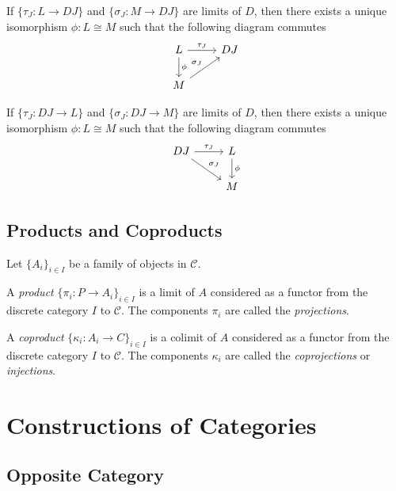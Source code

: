 \begin{thm}
If $\{ \tau_J : L \rightarrow D J \}$ and $\{ \sigma_J : M \rightarrow D J \}$ are limits of $D$, then there exists a unique isomorphism $\phi : L \cong M$ such that the following diagram commutes
\[ \begin{tikzcd}
L \arrow[r,"\tau_J"] \arrow[d,"\phi"] & D J \\
M \arrow[ur,"\sigma_J"]
\end{tikzcd} \]
\end{thm}

\begin{thm}
If $\{ \tau_J : D J \rightarrow L \}$ and $\{ \sigma_J : D J \rightarrow M \}$ are limits of $D$, then there exists a unique isomorphism $\phi : L \cong M$ such that the following diagram commutes
\[ \begin{tikzcd}
D J \arrow[r,"\tau_J"] \arrow[dr,"\sigma_J"] & L \arrow[d,"\phi"] \\
& M
\end{tikzcd} \]
\end{thm}

\section{Products and Coproducts}

\begin{df}[Product]
Let $\{ A_i \}_{i \in I}$ be a family of objects in $\mathcal{C}$. 

A \emph{product} $\{ \pi_i : P \rightarrow A_i \}_{i \in I}$ is a limit of $A$ considered as a functor from the discrete category $I$ to $\mathcal{C}$. The components $\pi_i$ are called the \emph{projections}.

A \emph{coproduct} $\{ \kappa_i : A_i \rightarrow C \}_{i \in I}$ is a colimit of $A$ considered as a functor from the discrete category $I$ to $\mathcal{C}$. The components $\kappa_i$ are called the \emph{coprojections} or \emph{injections}.
\end{df}

\chapter{Constructions of Categories}

\section{Opposite Category}


